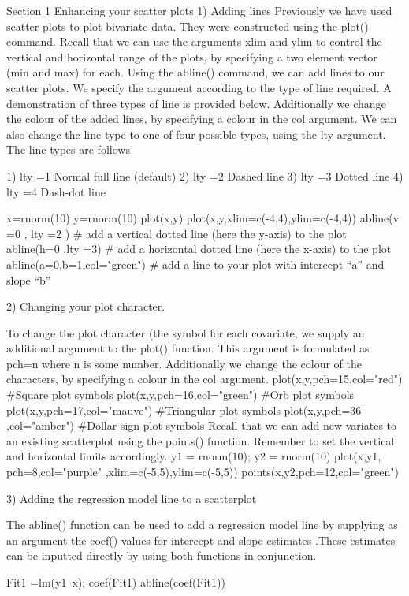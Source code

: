 Section 1 Enhancing your scatter plots
1)	Adding lines
Previously we have used scatter plots to plot bivariate data. They were constructed using the plot() command.  
Recall that we can use the arguments xlim and ylim to control the vertical and horizontal range of the plots, by specifying a two element vector (min and max) for each.
Using the abline() command, we can add lines to our scatter plots. We specify the argument according to the type of line required. A demonstration of three types of line is provided below.
Additionally we change the colour of the added lines, by specifying a colour in the col argument. We can also change the line type to one of four possible types, using the lty argument.
The line types are follows
 
1)	lty =1   Normal full line (default)
2)	lty =2   Dashed line 
3)	lty =3   Dotted line
4)	lty =4   Dash-dot line
 
x=rnorm(10)
y=rnorm(10)
plot(x,y)
plot(x,y,xlim=c(-4,4),ylim=c(-4,4))
abline(v =0 , lty =2 )    # add a vertical dotted line (here the y-axis) to the plot
abline(h=0  ,lty =3)    # add a horizontal dotted line (here the x-axis) to the plot
abline(a=0,b=1,col="green") # add a line to your plot with intercept “a” and slope “b”

2)	Changing your plot character.

To change the plot character (the symbol for each covariate, we supply an additional argument to the plot() function.  This argument is formulated as pch=n where n is some number.
Additionally we change the colour of the characters, by specifying a colour in the col argument.
plot(x,y,pch=15,col="red")		#Square plot symbols
plot(x,y,pch=16,col="green")		#Orb plot symbols
plot(x,y,pch=17,col="mauve")		#Triangular plot symbols
plot(x,y,pch=36	,col="amber")		#Dollar sign plot symbols
Recall that we can add new variates to an existing scatterplot using the points() function. Remember to set the vertical and horizontal limits accordingly.
y1 = rnorm(10); y2 = rnorm(10)
plot(x,y1, pch=8,col="purple" ,xlim=c(-5,5),ylim=c(-5,5))
points(x,y2,pch=12,col="green")

3)	Adding the regression model line to a scatterplot

The abline() function can be used to add a regression model line  by supplying as an argument the coef() values for intercept and slope estimates .These estimates can be inputted directly by using both functions in conjunction.

Fit1 =lm(y1~x);  coef(Fit1)
abline(coef(Fit1))	


